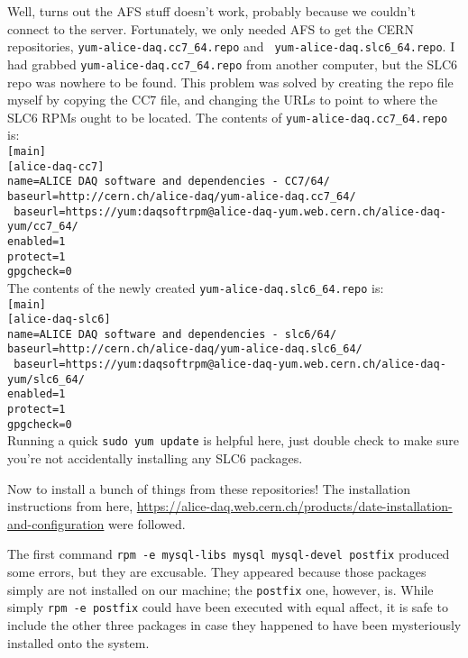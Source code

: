 \documentclass[12pt]{article}
\begin{document}
\qq Well, turns out the AFS stuff doesn't work, probably because we couldn't
connect to the server. Fortunately, we only needed AFS to get the CERN
repositories, {\tt yum-alice-daq.cc7\_64.repo} and {\tt
  yum-alice-daq.slc6\_64.repo}. I had grabbed {\tt yum-alice-daq.cc7\_64.repo}
from another computer, but the SLC6 repo was nowhere to be found. This problem
was solved by creating the repo file myself by copying the CC7 file, and
changing the URLs to point to where the SLC6 RPMs ought to be located. The
contents of {\tt yum-alice-daq.cc7\_64.repo} is: \\
{\tt [main]} \\
{\tt [alice-daq-cc7]} \\
{\tt name=ALICE DAQ software and dependencies - CC7/64/} \\
{\tt baseurl=http://cern.ch/alice-daq/yum-alice-daq.cc7\_64/} \\
{\tt
  baseurl=https://yum:daqsoftrpm@alice-daq-yum.web.cern.ch/alice-daq-yum/cc7\_64/}
\\
{\tt enabled=1} \\
{\tt protect=1} \\
{\tt gpgcheck=0} \\
The contents of the newly created {\tt yum-alice-daq.slc6\_64.repo} is: \\
{\tt [main]} \\
{\tt [alice-daq-slc6]} \\
{\tt name=ALICE DAQ software and dependencies - slc6/64/} \\
{\tt baseurl=http://cern.ch/alice-daq/yum-alice-daq.slc6\_64/} \\
{\tt
  baseurl=https://yum:daqsoftrpm@alice-daq-yum.web.cern.ch/alice-daq-yum/slc6\_64/}
\\
{\tt enabled=1} \\
{\tt protect=1} \\
{\tt gpgcheck=0} \\

Running a quick {\tt sudo yum update} is helpful here, just double check to make
sure you're not accidentally installing any SLC6 packages. 

\qq Now to install a bunch of things from these repositories! The installation
instructions from here,
\url{https://alice-daq.web.cern.ch/products/date-installation-and-configuration}
were followed. 

\qq The first command {\tt rpm -e mysql-libs mysql mysql-devel
  postfix} produced some errors, but they are excusable. They appeared because
those packages simply are not installed on our machine; the {\tt postfix} one,
however, is. While simply {\tt rpm -e postfix} could have been executed with
equal affect, it is safe to include the other three packages in case they
happened to have been mysteriously installed onto the system. 
\end{document}
